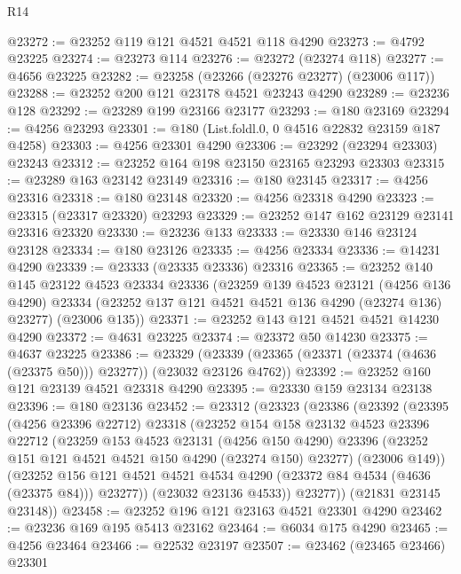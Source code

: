 \begin{lexlean}{R14}
\begin{coremodule}
@23272 := @23252 @119 @121 @4521 @4521 @118 @4290
@23273 := @4792 @23225
@23274 := @23273 @114
@23276 := @23272 (@23274 @118)
@23277 := @4656 @23225
@23282 := @23258 (@23266 (@23276 @23277) (@23006 @117))
@23288 := @23252 @200 @121 @23178 @4521 @23243 @4290
@23289 := @23236 @128
@23292 := @23289 @199 @23166 @23177
@23293 := @180 @23169
@23294 := @4256 @23293
@23301 := @180 (List.foldl.{0, 0} @4516 @22832 @23159 @187 @4258)
@23303 := @4256 @23301 @4290
@23306 := @23292 (@23294 @23303) @23243
@23312 := @23252 @164 @198 @23150 @23165 @23293 @23303
@23315 := @23289 @163 @23142 @23149
@23316 := @180 @23145
@23317 := @4256 @23316
@23318 := @180 @23148
@23320 := @4256 @23318 @4290
@23323 := @23315 (@23317 @23320) @23293
@23329 := @23252 @147 @162 @23129 @23141 @23316 @23320
@23330 := @23236 @133
@23333 := @23330 @146 @23124 @23128
@23334 := @180 @23126
@23335 := @4256 @23334
@23336 := @14231 @4290
@23339 := @23333 (@23335 @23336) @23316
@23365 := @23252
    @140
    @145
    @23122
    @4523
    @23334
    @23336
    (@23259
      @139
      @4523
      @23121
      (@4256 @136 @4290)
      @23334
      (@23252 @137 @121 @4521 @4521 @136 @4290 (@23274 @136) @23277)
      (@23006 @135))
@23371 := @23252 @143 @121 @4521 @4521 @14230 @4290
@23372 := @4631 @23225
@23374 := @23372 @50 @14230
@23375 := @4637 @23225
@23386 := @23329
    (@23339 (@23365 (@23371 (@23374 (@4636 (@23375 @50))) @23277)) (@23032 @23126 @4762))
@23392 := @23252 @160 @121 @23139 @4521 @23318 @4290
@23395 := @23330 @159 @23134 @23138
@23396 := @180 @23136
@23452 := @23312
    (@23323
      (@23386
        (@23392
          (@23395
            (@4256 @23396 @22712)
            @23318
            (@23252
              @154
              @158
              @23132
              @4523
              @23396
              @22712
              (@23259
                @153
                @4523
                @23131
                (@4256 @150 @4290)
                @23396
                (@23252 @151 @121 @4521 @4521 @150 @4290 (@23274 @150) @23277)
                (@23006 @149))
              (@23252
                @156
                @121
                @4521
                @4521
                @4534
                @4290
                (@23372 @84 @4534 (@4636 (@23375 @84)))
                @23277))
            (@23032 @23136 @4533))
          @23277))
      (@21831 @23145 @23148))
@23458 := @23252 @196 @121 @23163 @4521 @23301 @4290
@23462 := @23236 @169 @195 @5413 @23162
@23464 := @6034 @175 @4290
@23465 := @4256 @23464
@23466 := @22532 @23197
@23507 := @23462
    (@23465 @23466)
    @23301

\end{coremodule}
\end{lexlean}
